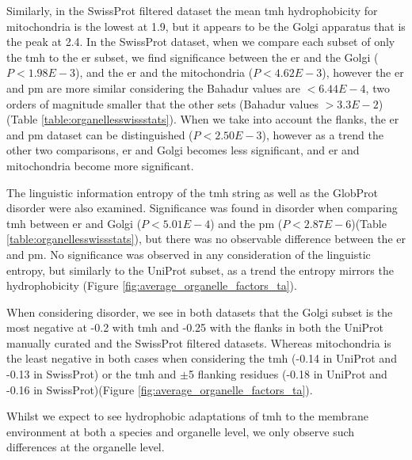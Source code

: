 Similarly, in the SwissProt filtered dataset the mean \gls{tmh} hydrophobicity for mitochondria is the lowest at 1.9, but it appears to be the Golgi apparatus that is the peak at 2.4.
In the SwissProt dataset, when we compare each subset of only the \gls{tmh} to the \gls{er} subset, we find significance between the \gls{er} and the Golgi ($P<1.98E-3$), and the \gls{er} and the mitochondria ($P<4.62E-3$), however the \gls{er} and \gls{pm} are more similar considering the Bahadur values are $<6.44E-4$, two orders of magnitude smaller that the other sets (Bahadur values $>3.3E-2$) (Table \ref{table:organellesswissstats}).
When we take into account the flanks, the \gls{er} and \gls{pm} dataset can be distinguished ($P<2.50E-3$), however as a trend the other two comparisons, \gls{er} and Golgi becomes less significant, and \gls{er} and mitochondria become more significant.

The linguistic information entropy of the \gls{tmh} string as well as the GlobProt disorder were also examined.
Significance was found in disorder when comparing \gls{tmh} between \gls{er} and Golgi ($P<5.01E-4$) and the \gls{pm} ($P<2.87E-6$)(Table \ref{table:organellesswissstats}), but there was no observable difference between the \gls{er} and \gls{pm}.
No significance was observed in any consideration of the linguistic entropy, but similarly to the UniProt subset, as a trend the entropy mirrors the hydrophobicity (Figure \ref{fig:average_organelle_factors_ta}).


When considering disorder, we see in both datasets that the Golgi subset is the most negative at -0.2 with \gls{tmh} and -0.25 with the flanks in both the UniProt manually curated and the SwissProt filtered datasets.
Whereas mitochondria is the least negative in both cases when considering the \gls{tmh} (-0.14 in UniProt and -0.13 in SwissProt) or the \gls{tmh} and $\pm$5 flanking residues (-0.18 in UniProt and -0.16 in SwissProt)(Figure \ref{fig:average_organelle_factors_ta}).

Whilst we expect to see hydrophobic adaptations of \gls{tmh} to the membrane environment at both a species and organelle level, we only observe such differences at the organelle level.


